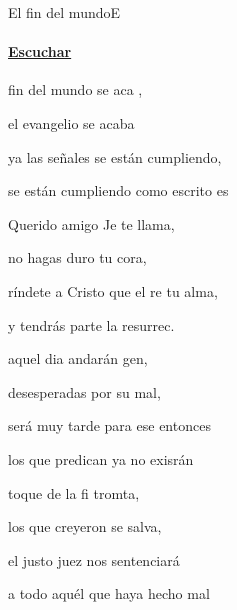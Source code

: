 \documentclass[12pt, spanish]{book}
\begin{document}
    \begin{song}{El fin del mundo}{E}
        {} %
        {}
        {} %
        {} %
        \ifChordBk
        \paragraph{\mbox{}\hfill\protect\href{https://open.spotify.com/intl-es/track/2t5BcSPWnQK1ufwNvawFHY}{Escuchar}\mbox{}\hfill}
        \fi

        \begin{SBOpGroup}
             fin del mundo se aca ,

            el evangelio se acaba

            ya las señales se están cumpliendo,

            se están cumpliendo como escrito es
        \end{SBOpGroup}

        \begin{SBChorus}
            Querido amigo Je te llama,

            no hagas duro tu cora,

            ríndete a Cristo que el re tu alma,

            y tendrás parte la resurrec.
        \end{SBChorus}

        \begin{SBOpGroup}
             aquel dia andarán  gen,

            desesperadas por su mal,

            será muy tarde para ese entonces

            los que predican ya no exisrán

        \end{SBOpGroup}

        \begin{SBOpGroup}
             toque de la fi tromta,

            los que creyeron se salva,

            el justo juez nos sentenciará

            a todo aquél que haya hecho  mal
        \end{SBOpGroup}


\end{song}
\end{document}
